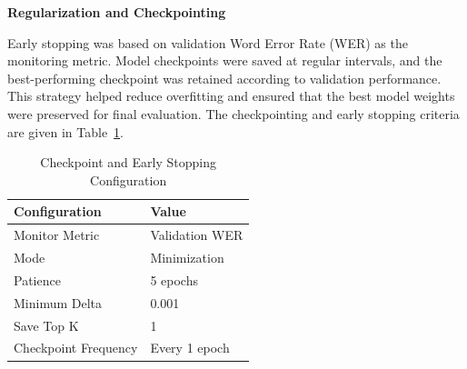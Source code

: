 \textbf{Regularization and Checkpointing}

Early stopping was based on validation Word Error Rate (WER) as the monitoring metric. Model checkpoints were saved at regular intervals, and the best-performing checkpoint was retained according to validation performance. This strategy helped reduce overfitting and ensured that the best model weights were preserved for final evaluation. The checkpointing and early stopping criteria are given in Table~\ref{tab:fastconformer_ckpt}.

\begin{table}[H]
\caption{Checkpoint and Early Stopping Configuration}
\label{tab:fastconformer_ckpt}
\centering
\begin{tabular}{|l|l|}
\hline
\textbf{Configuration} & \textbf{Value} \\
\hline
Monitor Metric & Validation WER \\
Mode & Minimization \\
Patience & 5 epochs \\
Minimum Delta & 0.001 \\
Save Top K & 1 \\
Checkpoint Frequency & Every 1 epoch \\
\hline
\end{tabular}
\end{table}






